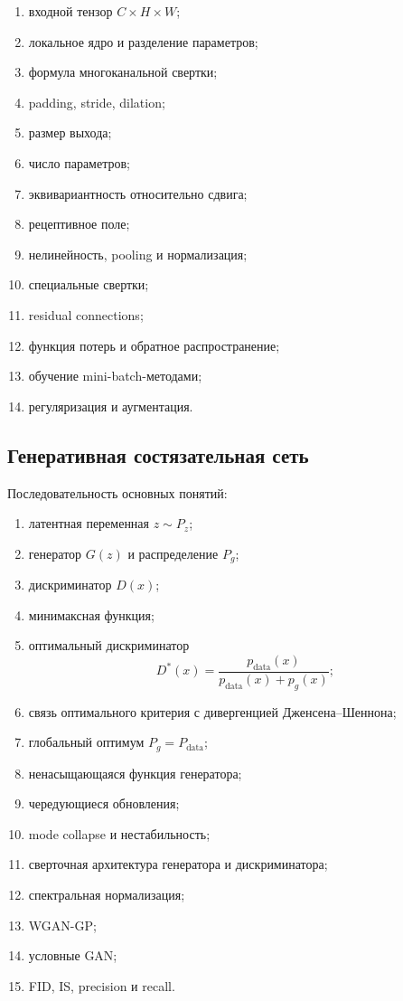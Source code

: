 \documentclass[12pt,a4paper]{article}
\numberwithin{equation}{section}
\theoremstyle{definition}
\theoremstyle{remark}
\begin{document}
\begin{enumerate}
    \item входной тензор \(C\times H\times W\);
    \item локальное ядро и разделение параметров;
    \item формула многоканальной свертки;
    \item padding, stride, dilation;
    \item размер выхода;
    \item число параметров;
    \item эквивариантность относительно сдвига;
    \item рецептивное поле;
    \item нелинейность, pooling и нормализация;
    \item специальные свертки;
    \item residual connections;
    \item функция потерь и обратное распространение;
    \item обучение mini-batch-методами;
    \item регуляризация и аугментация.
\end{enumerate}

\subsection*{Генеративная состязательная сеть}

Последовательность основных понятий:

\begin{enumerate}
    \item латентная переменная \(z\sim P_z\);
    \item генератор \(G(z)\) и распределение \(P_g\);
    \item дискриминатор \(D(x)\);
    \item минимаксная функция;
    \item оптимальный дискриминатор
    \[
        D^*(x)
        =
        \frac{p_{\mathrm{data}}(x)}
        {p_{\mathrm{data}}(x)+p_g(x)};
    \]
    \item связь оптимального критерия с дивергенцией
    Дженсена--Шеннона;
    \item глобальный оптимум \(P_g=P_{\mathrm{data}}\);
    \item ненасыщающаяся функция генератора;
    \item чередующиеся обновления;
    \item mode collapse и нестабильность;
    \item сверточная архитектура генератора и дискриминатора;
    \item спектральная нормализация;
    \item WGAN-GP;
    \item условные GAN;
    \item FID, IS, precision и recall.
\end{enumerate}
\end{document}
